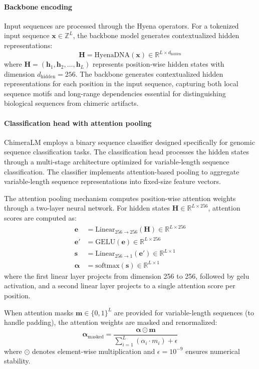 \documentclass[pdflatex,sn-nature]{sn-jnl}%
\theoremstyle{thmstyleone}%
\theoremstyle{thmstyletwo}%
\theoremstyle{thmstylethree}%
\begin{document}
\paragraph{Backbone encoding}
Input sequences are processed through the Hyena operators.
For a tokenized input sequence $\mathbf{x} \in \mathbb{Z}^{L}$, the backbone model generates contextualized hidden representations:
$$
	\mathbf{H} = \text{HyenaDNA}(\mathbf{x}) \in \mathbb{R}^{L \times d_{\text{hidden}}}
$$
where $\mathbf{H} = (\mathbf{h}_1, \mathbf{h}_2, \ldots, \mathbf{h}_L)$ represents position-wise hidden states with dimension $d_{\text{hidden}} = 256$.
The backbone generates contextualized hidden representations for each position in the input sequence, capturing both local sequence motifs and long-range dependencies essential for distinguishing biological sequences from chimeric artifacts.

\paragraph{Classification head with attention pooling}
ChimeraLM employs a binary sequence classifier designed specifically for genomic sequence classification tasks.
The classification head processes the hidden states through a multi-stage architecture optimized for variable-length sequence classification.
The classifier implements attention-based pooling to aggregate variable-length sequence representations into fixed-size feature vectors.

The attention pooling mechanism computes position-wise attention weights through a two-layer neural network.
For hidden states $\mathbf{H} \in \mathbb{R}^{L \times 256}$, attention scores are computed as:
\begin{align*}
	\mathbf{e}          & = \text{Linear}_{256 \to 256}(\mathbf{H}) \in \mathbb{R}^{L \times 256} \\
	\mathbf{e}'         & = \text{GELU}(\mathbf{e}) \in \mathbb{R}^{L \times 256}                 \\
	\mathbf{s}          & = \text{Linear}_{256 \to 1}(\mathbf{e}') \in \mathbb{R}^{L \times 1}    \\
	\boldsymbol{\alpha} & = \text{softmax}(\mathbf{s}) \in \mathbb{R}^{L \times 1}
\end{align*}
where the first linear layer projects from dimension 256 to 256, followed by \gls{gelu} activation, and a second linear layer projects to a single attention score per position.

When attention masks $\mathbf{m} \in \{0,1\}^L$ are provided for variable-length sequences (to handle padding), the attention weights are masked and renormalized:
$$
	\boldsymbol{\alpha}_{\text{masked}} = \frac{\boldsymbol{\alpha} \odot \mathbf{m}}{\sum_{i=1}^{L} (\alpha_i \cdot m_i) + \epsilon}
$$
where $\odot$ denotes element-wise multiplication and $\epsilon = 10^{-9}$ ensures numerical stability.
\end{document}
